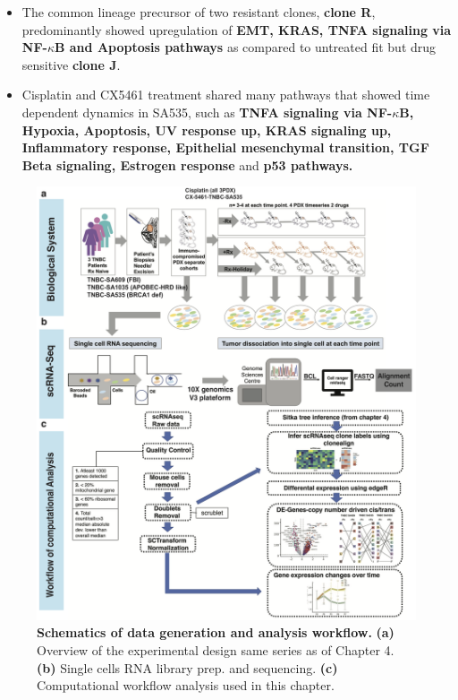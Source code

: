 \begin{itemize}
 \item The common lineage precursor of two resistant clones, \textbf{clone R}, predominantly showed upregulation  of \textbf{EMT, KRAS, TNFA signaling via NF-$\kappa$B and Apoptosis pathways} as compared to untreated fit but drug sensitive \textbf{clone J}.
 
  \item Cisplatin and CX5461 treatment shared many pathways that showed time dependent dynamics in SA535, such as \textbf{TNFA signaling via NF-$\kappa$B, Hypoxia, Apoptosis, UV response up, KRAS signaling up, Inflammatory response, Epithelial mesenchymal transition, TGF Beta signaling, Estrogen response} and \textbf{p53 pathways.}

\end{itemize}

\begin{figure}
\centering
\includegraphics[width=\textwidth]{Figures/chap5/RNAworkflow.png}
	
\caption[Schematics of experimental design and analysis workflow]
	{\small
	\textbf{Schematics of data generation and analysis workflow.}
	   \textbf{(a)} Overview of the experimental design same series as of Chapter 4.
	    \textbf{(b)} Single cells RNA library prep. and sequencing.
	    \textbf{(c)} Computational workflow analysis used in this chapter.
	}
	\label{fig:chap5RNAworkflow}
\end{figure}
\newpage

